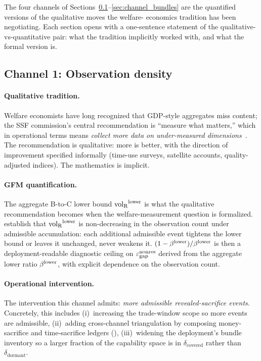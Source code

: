 The four channels of
Sections~\ref{sec:channel_observation}--\ref{sec:channel_bundles}
are the quantified versions of the qualitative moves the welfare-
economics tradition has been negotiating.  Each section opens with
a one-sentence statement of the qualitative-vs-quantitative pair:
what the tradition implicitly worked with, and what the formal
version is.

\subsection{Channel 1: Observation density}
\label{sec:channel_observation}

\paragraph{Qualitative tradition.}
Welfare economists have long recognized that GDP-style aggregates
miss content; the SSF commission's central recommendation is
``measure what matters,'' which in operational terms means
\emph{collect more data on under-measured dimensions}~\citep{stiglitz2009report}.
The recommendation is qualitative: more is better, with the
direction of improvement specified informally (time-use surveys,
satellite accounts, quality-adjusted indices).  The mathematics
is implicit.

\paragraph{GFM quantification.}
The
\citep[Theorem~2]{lasser2026paper8a} aggregate B-to-C lower bound
${\operatorname{vol}_{\mathrm{R}}}^{\mathrm{lower}}$ is what the qualitative recommendation becomes when
the welfare-measurement question is formalized.
\citep[Propositions~2~and~3]{lasser2026paper8a} establish that
${\operatorname{vol}_{\mathrm{R}}}^{\mathrm{lower}}$ is non-decreasing in the observation count under
admissible accumulation: each additional admissible event tightens
the lower bound or leaves it unchanged, never weakens it.
$(1 - \beta^{\mathrm{lower}})/\beta^{\mathrm{lower}}$ is then a deployment-readable diagnostic
ceiling on $\varepsilon_{\mathrm{gap}}^{\mathrm{nonres}}$ derived from the aggregate lower ratio
$\beta^{\mathrm{lower}}$, with explicit dependence on the observation count.

\paragraph{Operational intervention.}
The intervention this channel admits: \emph{more admissible
revealed-sacrifice events}.  Concretely, this includes
(i)~increasing the trade-window scope so more events are admissible,
(ii)~adding cross-channel triangulation by composing money-sacrifice
and time-sacrifice ledgers
(\citep[Section~4]{lasser2026paper8a}), (iii)~widening the
deployment's bundle inventory so a larger fraction of the
capability space is in $\delta_{\mathrm{covered}}$ rather than
$\delta_{\mathrm{dormant}}$.

